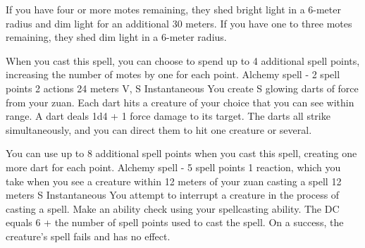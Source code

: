         If you have four or more motes remaining, they shed bright light in a 6-meter radius and dim light for an additional 30 meters.
        If you have one to three motes remaining, they shed dim light in a 6-meter radius.

        When you cast this spell, you can choose to spend up to 4 additional spell points, increasing the number of motes by one for each point.
        {Alchemy spell - 2 spell points}
        {2 actions}
        {24 meters}
        {V, S}
        {Instantaneous}
        You create S glowing darts of force from your zuan.
        Each dart hits a creature of your choice that you can see within range.
        A dart deals 1d4 + 1 force damage to its target.
        The darts all strike simultaneously, and you can direct them to hit one creature or several.

        You can use up to 8 additional spell points when you cast this spell, creating one more dart for each point.
        {Alchemy spell - 5 spell points}
        {1 reaction, which you take when you see a creature within 12 meters of your zuan casting a spell}
        {12 meters}
        {S}
        {Instantaneous}
        You attempt to interrupt a creature in the process of casting a spell.
        Make an ability check using your spellcasting ability.
        The DC equals 6 + the number of spell points used to cast the spell.
        On a success, the creature's spell fails and has no effect.

